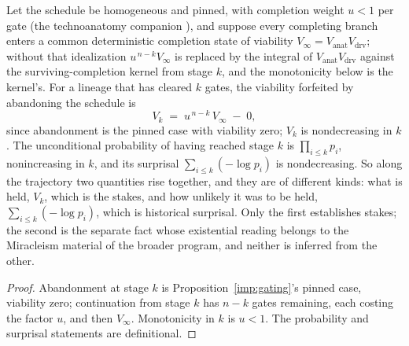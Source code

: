 \begin{proposition}\label{hr:rem:monotone}
Let the schedule be homogeneous and pinned, with completion weight
$u<1$ per gate (the technoanatomy companion \cite{GoldenTechnoanatomy}), and suppose
every completing branch enters a common deterministic completion state
of viability $V_\infty=V_{\mathrm{anat}}V_{\mathrm{drv}}$; without that
idealization $u^{\,n-k}V_\infty$ is replaced by the integral of
$V_{\mathrm{anat}}V_{\mathrm{drv}}$ against the surviving-completion kernel from stage
$k$, and the monotonicity below is the kernel's. For a lineage that has
cleared $k$ gates, the viability forfeited by abandoning the schedule
is
\begin{equation}\label{hr:eq:optionvalue}
V_k\;=\;u^{\,n-k}\,V_\infty\;-\;0,
\end{equation}
since abandonment is the pinned case with viability zero; $V_k$ is
nondecreasing in $k$. The unconditional probability of having reached
stage $k$ is $\prod_{i\le k}p_i$, nonincreasing in $k$, and its
surprisal $\sum_{i\le k}(-\log p_i)$ is nondecreasing. So along the
trajectory two quantities rise together, and they are of different
kinds: what is held, $V_k$, which is the stakes, and how unlikely it
was to be held, $\sum_{i\le k}(-\log p_i)$, which is historical
surprisal. Only the first establishes stakes; the second is the
separate fact whose existential reading belongs to the Miracleism
material of the broader program, and neither is inferred from the
other.
\end{proposition}

\begin{proof}
Abandonment at stage $k$ is Proposition~\ref{imp:gating}'s pinned
case, viability zero; continuation from stage $k$ has $n-k$ gates
remaining, each costing the factor $u$, and then $V_\infty$. Monotonicity
in $k$ is $u<1$. The probability and surprisal statements are
definitional.
\end{proof}

